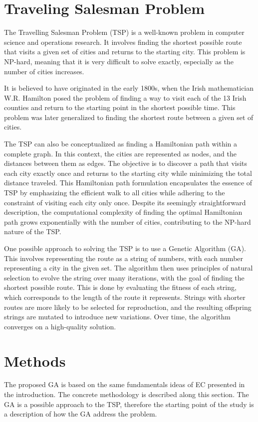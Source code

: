 \documentclass[10pt,a4paper]{article}
\begin{document}
\section{Traveling Salesman Problem}
The Travelling Salesman Problem (TSP) is a well-known problem in computer science and operations research. It involves finding the shortest possible route that visits a given set of cities and returns to the starting city. This problem is NP-hard, meaning that it is very difficult to solve exactly, especially as the number of cities increases. 

It is believed to have originated in the early 1800s, when the Irish mathematician W.R. Hamilton posed the problem of finding a way to visit each of the 13 Irish counties and return to the starting point in the shortest possible time. This problem was later generalized to finding the shortest route between a given set of cities.

The TSP can also be conceptualized as finding a Hamiltonian path within a complete graph. In this context, the cities are represented as nodes, and the distances between them as edges. The objective is to discover a path that visits each city exactly once and returns to the starting city while minimizing the total distance traveled. This Hamiltonian path formulation encapsulates the essence of TSP by emphasizing the efficient walk to all cities while adhering to the constraint of visiting each city only once. Despite its seemingly straightforward description, the computational complexity of finding the optimal Hamiltonian path grows exponentially with the number of cities, contributing to the NP-hard nature of the TSP.

One possible approach to solving the TSP is to use a Genetic Algorithm (GA). This involves representing the route as a string of numbers, with each number representing a city in the given set. The algorithm then uses principles of natural selection to evolve the string over many iterations, with the goal of finding the shortest possible route. This is done by evaluating the fitness of each string, which corresponds to the length of the route it represents. Strings with shorter routes are more likely to be selected for reproduction, and the resulting offspring strings are mutated to introduce new variations. Over time, the algorithm converges on a high-quality solution.

\section{Methods}
The proposed GA is based on the same fundamentals ideas of EC presented in the introduction. The concrete methodology is described along this section. The GA is a possible approach to the TSP, therefore the starting point of the study is a description of how the GA address the problem. 
\end{document}
